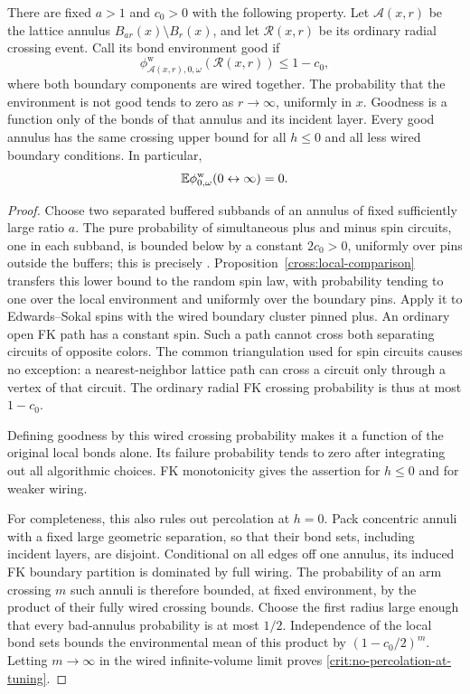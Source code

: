 \begin{lemma}
\label{crit:ring-barrier}
There are fixed $a>1$ and $c_0>0$ with the following property. Let
$\mathcal A(x,r)$ be the lattice annulus
$B_{ar}(x)\setminus B_r(x)$, and let $\mathcal R(x,r)$ be its ordinary
radial crossing event. Call its bond environment good if
\[
 \phi_{\mathcal A(x,r),0,\omega}^{\mathrm w}
       (\mathcal R(x,r))\le1-c_0,
\]
where both boundary components are wired together. The probability that the
environment is not good tends to zero as $r\to\infty$, uniformly in
$x$. Goodness is a function only of the bonds of that annulus and its
incident layer. Every good annulus has the same crossing upper bound
for all $h\le0$ and all less wired boundary conditions. In particular,
\begin{equation}
 \mathbb E\phi_{0,\omega}^{\mathrm w}(0\leftrightarrow\infty)=0.
 \label{crit:no-percolation-at-tuning}
\end{equation}
\end{lemma}

\begin{proof}
Choose two separated buffered subbands of an annulus of fixed sufficiently
large ratio $a$. The pure probability of simultaneous plus and minus spin
circuits, one in each subband, is bounded below by a constant $2c_0>0$,
uniformly over pins outside the buffers; this is precisely
\cite[Section~2, Proposition ``Pure buffered RSW consequences'']{S}.
Proposition~\ref{cross:local-comparison} transfers this lower bound to
the random spin law, with probability tending to one over the local
environment and uniformly over the boundary pins. Apply it to
Edwards--Sokal spins with the wired boundary cluster pinned plus.
An ordinary open FK path has a constant spin. Such a path cannot cross
both separating circuits of opposite colors. The common triangulation
used for spin circuits causes no exception: a nearest-neighbor lattice
path can cross a circuit only through a vertex of that circuit. The
ordinary radial FK crossing probability is thus at most $1-c_0$.

Defining goodness by this wired crossing probability makes it a function
of the original local bonds alone. Its failure probability tends to zero
after integrating out all algorithmic choices. FK monotonicity gives
the assertion for $h\le0$ and for weaker wiring.

For completeness, this also rules out percolation at $h=0$. Pack
concentric annuli with a fixed large geometric separation, so that their
bond sets, including incident layers, are disjoint. Conditional on all
edges off one annulus, its induced FK boundary partition is dominated by
full wiring. The probability of an arm crossing $m$ such annuli is
therefore bounded, at fixed environment, by the product of their fully
wired crossing bounds. Choose the first radius large enough that every
bad-annulus probability is at most $1/2$. Independence of the local bond
sets bounds the environmental mean of this product by
$(1-c_0/2)^m$. Letting $m\to\infty$ in the wired infinite-volume limit
proves \eqref{crit:no-percolation-at-tuning}.
\end{proof}

